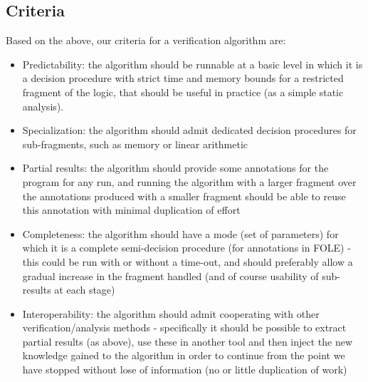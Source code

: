 \subsection{Criteria}
Based on the above, our criteria for a verification algorithm are:
\begin{itemize}
	\item Predictability: the algorithm should be runnable at a basic level in which it is a decision procedure with strict time and memory bounds for a restricted fragment of the logic, that should be useful in practice (as a simple static analysis).
	\item Specialization: the algorithm should admit dedicated decision procedures for sub-fragments, such as memory or linear arithmetic
	\item Partial results: the algorithm should provide some annotations for the program for any run, and running the algorithm with a larger fragment over the annotations produced with a smaller fragment should be able to reuse this annotation with minimal duplication of effort
	\item Completeness: the algorithm should have a mode (set of parameters) for which it is a complete semi-decision procedure (for annotations in FOLE) - this could be run with or without a time-out, and should preferably allow a gradual increase in the fragment handled (and of course usability of sub-results at each stage)
	\item Interoperability: the algorithm should admit cooperating with other verification/analysis methods - specifically it should be possible to extract partial results (as above), use these in another tool and then inject the new knowledge gained to the algorithm in order to continue from the point we have stopped without lose of information (no or little duplication of work)
\end{itemize}
